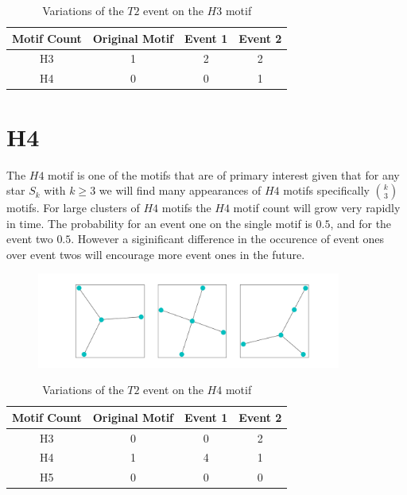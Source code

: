 \begin{table}[h!]
    \centering
        \begin{tabular}{||c c c c||} 
            \hline
            Motif Count & Original Motif & Event 1 & Event 2\\ [0.5ex] 
            \hline\hline
            H3 & 1 & 2 & 2\\ 
            \hline
            H4 & 0 & 0 & 1\\
            \hline
        \end{tabular}
        \caption{Variations of the $T2$ event on the $H3$ motif}
        \label{table:1}
\end{table}

\section{H4}
The $H4$ motif is one of the motifs that are of primary interest given that for any star $S_k$
with $k \geq 3$ we will find many appearances of $H4$ motifs specifically ${k \choose 3}$ motifs. For large
clusters of $H4$ motifs the $H4$ motif count will grow very rapidly in time. The probability 
for an event one on the single motif is $0.5$, and for the event two $0.5$. However a siginificant
difference in the occurence of event ones over event twos will encourage more event ones in the future. 


\vspace{3mm}

\begin{figure}[!ht]
    \includegraphics[width=10cm]{Images/H4_evolution.png}
    \centering
\end{figure}

\begin{table}[h!]
    \centering
    \begin{tabular}{||c c c c||} 
    \hline
    Motif Count & Original Motif & Event 1 & Event 2\\ [0.5ex] 
    \hline\hline
    H3 & 0 & 0 & 2\\ 
    \hline
    H4 & 1 & 4 & 1\\
    \hline
    H5 & 0 & 0 & 0\\
    \hline
   \end{tabular}
   \caption{Variations of the $T2$ event on the $H4$ motif}
    \label{table:2}
\end{table}


